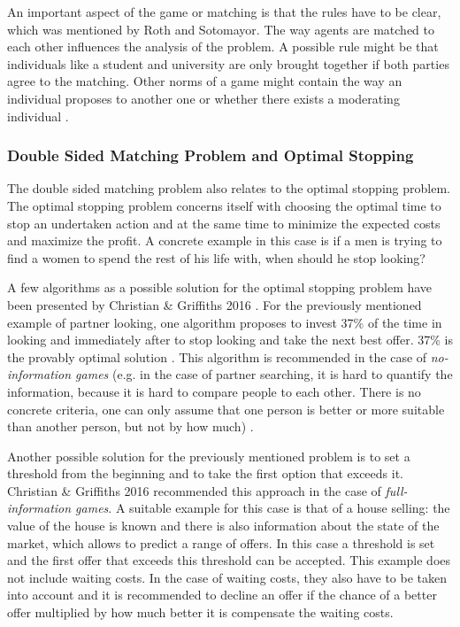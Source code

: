 An important aspect of the game or matching is that the rules have to be clear, which was mentioned by Roth and Sotomayor.
The way agents are matched to each other influences the analysis of the problem.
A possible rule might be that individuals like a student and university are only brought together if both parties agree to the matching.
Other norms of a game might contain the way an individual proposes to another one or whether there exists a moderating individual \cite[p. 492]{roth1992two}.

\subsubsection{Double Sided Matching Problem and Optimal Stopping}
The double sided matching problem also relates to the optimal stopping problem. 
The optimal stopping problem concerns itself with choosing the optimal time to stop an undertaken action and at the same time to minimize the expected costs and maximize the profit. A concrete example in this case is if a men is trying to find a women to spend the rest of his life with, when should he stop looking?

A few algorithms as a possible solution for the optimal stopping problem have been presented by Christian \& Griffiths 2016 \cite{algtoliveby}. 
For the previously mentioned example of partner looking, one algorithm proposes to invest 37\% of the time in looking and immediately after to stop looking and take the next best offer. 
37\% is the provably optimal solution \cite[p. 2]{algtoliveby}. 
This algorithm is recommended in the case of \textit{no-information games} (e.g. in the case of partner searching, it is hard to quantify the information, because it is hard to compare people to each other. There is no concrete criteria, one can only assume that one person is better or more suitable than another person, but not by how much) \cite[p. 18]{algtoliveby}.

Another possible solution for the previously mentioned problem is to set a threshold from the beginning and to take the first option that exceeds it. 
Christian \& Griffiths 2016 \cite{algtoliveby} recommended this approach in the case of \textit{full-information games}.
A suitable example for this case is that of a house selling: the value of the house is known and there is also information about the state of the market, which allows to predict a range of offers. 
In this case a threshold is set and the first offer that exceeds this threshold can be accepted.
This example does not include waiting costs. In the case of waiting costs, they also have to be taken into account and it is recommended to decline an offer if the chance of a better offer multiplied by how much better it is compensate the waiting costs.




